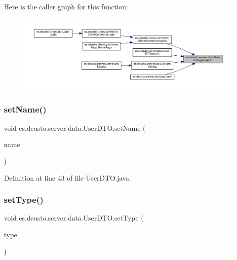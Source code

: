 Here is the caller graph for this function\+:
\nopagebreak
\begin{figure}[H]
\begin{center}
\leavevmode
\includegraphics[width=350pt]{classes_1_1deusto_1_1server_1_1data_1_1_user_d_t_o_ae04b78d874974f7f3307b68fa2a15210_icgraph}
\end{center}
\end{figure}
\mbox{\label{classes_1_1deusto_1_1server_1_1data_1_1_user_d_t_o_a15f7773676e2cca068e63f604fb61ab0}} 
\subsubsection{\texorpdfstring{setName()}{setName()}}
{\footnotesize\ttfamily void es.\+deusto.\+server.\+data.\+User\+D\+T\+O.\+set\+Name (\begin{DoxyParamCaption}\item[{String}]{name }\end{DoxyParamCaption})}



Definition at line 43 of file User\+D\+T\+O.\+java.

\mbox{\label{classes_1_1deusto_1_1server_1_1data_1_1_user_d_t_o_aa02d6027ea9d142a1358f142f5c88f2d}} 
\subsubsection{\texorpdfstring{setType()}{setType()}}
{\footnotesize\ttfamily void es.\+deusto.\+server.\+data.\+User\+D\+T\+O.\+set\+Type (\begin{DoxyParamCaption}\item[{\mbox{\hyperlink{enumes_1_1deusto_1_1server_1_1jdo_1_1_user_type}{User\+Type}}}]{type }\end{DoxyParamCaption})}



